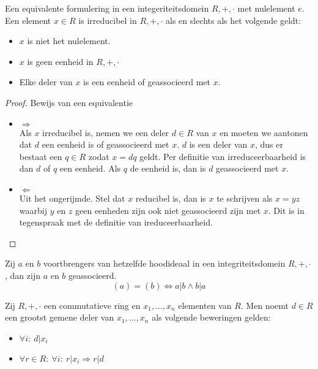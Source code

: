 \documentclass[main.tex]{subfiles}
\begin{document}
\begin{ei}
  Een equivalente formulering in een integeriteitsdomein $R,+,\cdot$ met nulelement $e$.\\
  Een element $x\in R$ is irreducibel in $R,+,\cdot$ als en slechts als het volgende geldt:
  \begin{itemize}
  \item $x$ is niet het nulelement.
  \item $x$ is geen eenheid in $R,+,\cdot$
  \item Elke deler van $x$ is een eenheid of geassocieerd met $x$.
  \end{itemize}

  \begin{proof}
    Bewijs van een equivalentie\\
    \begin{itemize}
    \item $\Rightarrow$\\
      Als $x$ irreducibel is, nemen we een deler $d\in R$ van $x$ en moeten we aantonen dat $d$ een eenheid is of geassocieerd met $x$.
      $d$ is een deler van $x$, dus er bestaat een $q\in R$ zodat $x=dq$ geldt.
      Per definitie van irreduceerbaarheid is dan $d$ of $q$ een eenheid.
      Als $q$ de eenheid is, dan is $d$ geassocieerd met $x$.
    \item $\Leftarrow$\\
      Uit het ongerijmde.
      Stel dat $x$ reducibel is, dan is $x$ te schrijven als $x=yz$ waarbij $y$ en $z$ geen eenheden zijn ook niet geassocieerd zijn met $x$.
      Dit is in tegenspraak met de definitie van ireduceerbaarheid.
    \end{itemize}
  \end{proof}
\end{ei}

\begin{gev}
  Zij $a$ en $b$ voortbrengers van hetzelfde hoodideaal in een integriteitsdomein $R,+,\cdot$, dan zijn $a$ en $b$ geassocieerd.
  \[ (a) = (b) \Leftrightarrow a|b \wedge b|a \]
\end{gev}

\begin{de}
  Zij $R,+,\cdot$ een commutatieve ring en $x_{1},\dotsc,x_{n}$ elementen van $R$.
  Men noemt $d\in R$ een grootst gemene deler van $x_{1},\dotsc,x_{n}$ als volgende beweringen gelden:
  \begin{itemize}
  \item $\forall i:\ d|x_{i}$
  \item $\forall r \in R:\ \forall i:\ r|x_{i} \Rightarrow r|d$
  \end{itemize}
\end{de}
\end{document}
